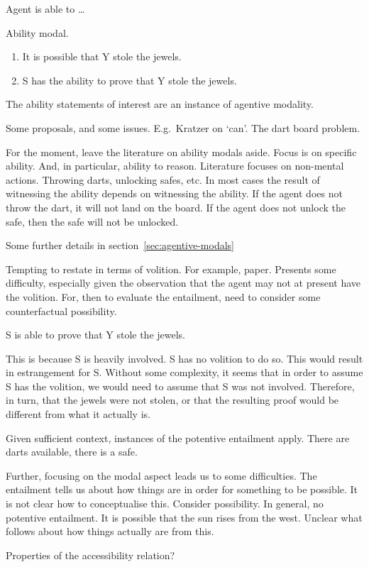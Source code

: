 \begin{note}
  Agent is able to \dots

  Ability modal.

  \begin{enumerate}
  \item It is possible that Y stole the jewels.
  \item S has the ability to prove that Y stole the jewels.
  \end{enumerate}

  The ability statements of interest are an instance of agentive modality.
  \cite{Mandelkern:2017aa}
  \cite{Maier:2013vk}
  \cite{Schwarz:2020aa}
  \cite{Willer:2021ur}
  \cite{Maier:2021te}

  Some proposals, and some issues.
  E.g.\ Kratzer on `can'.
  The dart board problem.

  For the moment, leave the literature on ability modals aside.
  Focus is on specific ability.
  And, in particular, ability to reason.
  Literature focuses on non-mental actions.
  Throwing darts, unlocking safes, etc.
  In most cases the result of witnessing the ability depends on witnessing the ability.
  If the agent does not throw the dart, it will not land on the board.
  If the agent does not unlock the safe, then the safe will not be unlocked.

  Some further details in section~\ref{sec:agentive-modals}
\end{note}

\begin{note}[No volition]
  Tempting to restate in terms of volition.
  For example, paper.
  Presents some difficulty, especially given the observation that the agent may not at present have the volition.
  For, then to evaluate the entailment, need to consider some counterfactual possibility.

  S is able to prove that Y stole the jewels.

  This is because S is heavily involved.
  S has no volition to do so.
  This would result in estrangement for S.
  Without some complexity, it seems that in order to assume S has the volition, we would need to assume that S was not involved.
  Therefore, in turn, that the jewels were not stolen, or that the resulting proof would be different from what it actually is.
\end{note}

\begin{note}
  Given sufficient context, instances of the potentive entailment apply.
  There are darts available, there is a safe.

  Further, focusing on the modal aspect leads us to some difficulties.
  The entailment tells us about how things are in order for something to be possible.
  It is not clear how to conceptualise this.
  Consider possibility.
  In general, no potentive entailment.
  It is possible that the sun rises from the west.
  Unclear what follows about how things actually are from this.

  Properties of the accessibility relation?
\end{note}